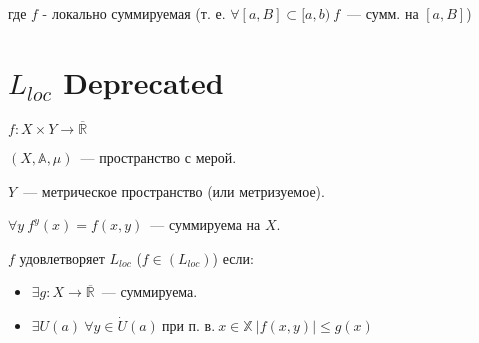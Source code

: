 \documentclass[paper=a4, fontsize=17pt]{article}
\begin{document}
	где $ f $ - локально суммируемая (т. е. $ \forall [a, B] \subset [a, b) ~ f $~--- сумм. на $ [a, B] $)

	\section{$ L_{loc} $ \Large Deprecated}

	$ f : X \times Y \rightarrow \overline{\mathbb{R}}$

	$ (X, \mathds{A}, \mu) $~--- пространство с мерой.

	$Y$~--- метрическое пространство (или метризуемое).

	$\forall y \ f^y(x) = f(x, y)$~--- суммируема на $X$.

	$f$ удовлетворяет $L_{loc}$ ($ f \in (L_{loc}) $) если:
	\begin{itemize}
		\item $ \exists g : X \rightarrow \overline{\mathbb{R}} $~--- суммируема.
		\item $ \exists U(a) \ \forall y \in \dot{U} (a) \ \text{при п. в.} ~ x \in \mathbb{X} ~ |f(x, y)| \leq g(x)$
	\end{itemize}
\end{document}
